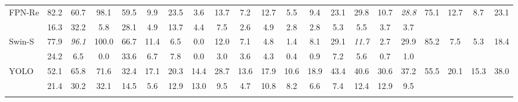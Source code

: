 \begin{table}[!htb]
\begin{tabular}{lcccccccccccccccccccc}
\addlinespace
FPN-Re & 82.2 & 60.7 & 98.1 & 59.5 & 9.9 & 23.5 & 3.6 & 13.7 & 7.2 & 12.7 & 5.5 & 9.4 & 23.1 & 29.8 & 10.7 & \textit{28.8} & 75.1 & 12.7 & 8.7 & 23.1 \\
 & 16.3 & 32.2 & 5.8 & 28.1 & 4.9 & 13.7 & 4.4 & 7.5 & 2.6 & 4.9 & 2.8 & 2.8 & 5.3 & 5.5 & 3.7 & 3.7 &  &  &  &  \\
\addlinespace
Swin-S & 77.9 & \textit{96.1} & 100.0 & 66.7 & 11.4 & 6.5 & 0.0 & 12.0 & 7.1 & 4.8 & 1.4 & 8.1 & 29.1 & \textit{11.7} & 2.7 & 29.9 & 85.2 & 7.5 & 5.3 & 18.4 \\
 & 24.2 & 6.5 & 0.0 & 33.6 & 6.7 & 7.8 & 0.0 & 3.0 & 3.6 & 4.3 & 0.4 & 0.9 & 7.2 & 5.6 & 0.7 & 1.0 &  &  &  &  \\
\addlinespace
YOLO & 52.1 & 65.8 & 71.6 & 32.4 & 17.1 & 20.3 & 14.4 & 28.7 & 13.6 & 17.9 & 10.6 & 18.9 & 43.4 & 40.6 & 30.6 & 37.2 & 55.5 & 20.1 & 15.3 & 38.0 \\
 & 21.4 & 30.2 & 32.1 & 14.5 & 5.6 & 12.9 & 13.0 & 9.5 & 4.7 & 10.8 & 8.2 & 6.6 & 7.4 & 12.4 & 12.9 & 9.5 &  &  &  &  \\
\addlinespace
\bottomrule
\end{tabular}
\end{table}
